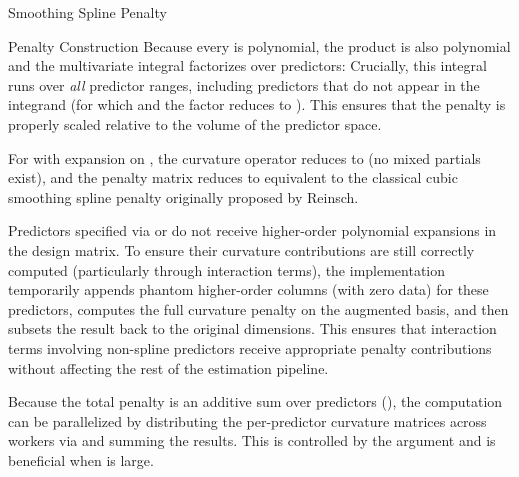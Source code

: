 \begin{Section}{Smoothing Spline Penalty}
\begin{SubSection}{Penalty Construction}
Because every  is polynomial, the product
 is also polynomial and the multivariate
integral factorizes over predictors:
Crucially, this integral runs over \emph{all}  predictor ranges,
including predictors that do not appear in the integrand (for which
 and the factor reduces to ). This ensures
that the penalty is properly scaled relative to the volume of the
predictor space.

For  with expansion
 on \eqn{[a, b]}{}, the
curvature operator reduces to  (no
mixed partials exist), and the penalty matrix reduces to
equivalent to the classical cubic smoothing spline penalty originally proposed by Reinsch.

Predictors specified via  or
 do not receive higher-order
polynomial expansions in the design matrix. To ensure their curvature
contributions are still correctly computed (particularly through
interaction terms), the implementation temporarily appends phantom
higher-order columns (with zero data) for these predictors, computes
the full curvature penalty on the augmented basis, and then subsets the
result back to the original  dimensions. This ensures
that interaction terms involving non-spline predictors receive appropriate
penalty contributions without affecting the rest of the estimation
pipeline.

Because the total penalty is an additive sum over predictors
(),
the computation can be parallelized by distributing the per-predictor
curvature matrices across workers via  and
summing the results. This is controlled by the 
argument and is beneficial when  is large.


\end{SubSection}
\end{Section}
